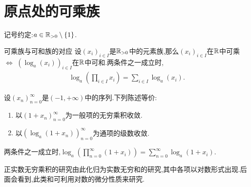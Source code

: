 \section{原点处的可乘族}

记号约定:$a\in\mathbb{R}_{>0}\setminus\left\{1\right\}$.

\begin{proposition}{可乘族与可和族的对应}{}
	设$\left(x_{i}\right)_{i\in I}$是$\mathbb{R}_{>0}$中的元素族,那么$\left(x_{i}\right)_{i\in I}$在$\mathbb{R}$中可乘$\iff$ $\left(\log_{a}\left(x_{i}\right)\right)_{i\in I}$在$\mathbb{R}$中可和.两条件之一成立时,
	\begin{align*}
		\log_{a}\left(\prod\limits_{i\in I}x_{i}\right)=\sum\limits_{i\in I}\log_{a}\left(x_{i}\right).
	\end{align*}
\end{proposition}

\begin{proposition}{}{}
	设$\left(x_{n}\right)_{n=0}^{\infty}$是$\left(-1,+\infty\right)$中的序列.下列陈述等价:
	\begin{enumerate}
		\item 以$\left(1+x_{n}\right)_{n=0}^{\infty}$为一般项的无穷乘积收敛.
		\item 以$\left(\log_{a}\left(1+x_{n}\right)\right)_{n=0}^{\infty}$为通项的级数收敛.
	\end{enumerate}
	两条件之一成立时,$\log_{a}\left(\prod\limits_{n=0}^{\infty}\left(1+x_{i}\right)\right)=\sum\limits_{n=0}^{\infty}\log_{a}\left(1+x_{i}\right)$.
\end{proposition}

\begin{remark}{}{}
	正实数无穷乘积的研究由此化归为实数无穷和的研究,其中各项以对数形式出现.后面会看到,此类和可利用对数的微分性质来研究.
\end{remark}
